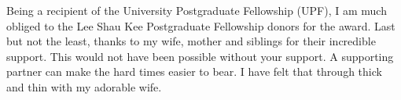 Being a recipient of the University Postgraduate Fellowship (UPF),
I am much obliged to the Lee Shau Kee Postgraduate Fellowship donors
for the award.
Last but not the least,
thanks to my wife, mother and siblings for their
incredible support. This would not have been possible
without your support. A supporting partner can make the
hard times easier to bear. I have felt that through thick
and thin with my adorable wife.